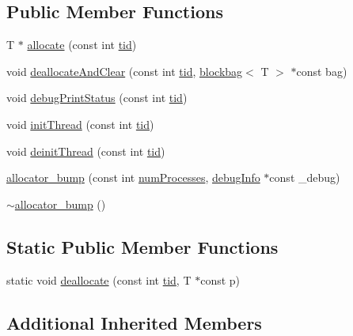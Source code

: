 \subsection*{Public Member Functions}
\begin{DoxyCompactItemize}
\item 
T $\ast$ \hyperlink{classallocator__bump_ac89d92a322a51aed0f08311ec3cdbed6}{allocate} (const int \hyperlink{microbench_2main_8cpp_a9ca9869868fe7e7a38a921cc7de4103f}{tid})
\item 
void \hyperlink{classallocator__bump_a8e6c842b2ebf9918ae2035eff838ff77}{deallocate\+And\+Clear} (const int \hyperlink{microbench_2main_8cpp_a9ca9869868fe7e7a38a921cc7de4103f}{tid}, \hyperlink{classblockbag}{blockbag}$<$ T $>$ $\ast$const bag)
\item 
void \hyperlink{classallocator__bump_a59eee0e27ff339347eff13214bafd377}{debug\+Print\+Status} (const int \hyperlink{microbench_2main_8cpp_a9ca9869868fe7e7a38a921cc7de4103f}{tid})
\item 
void \hyperlink{classallocator__bump_ac363b41fc27681855131e6d7c6c31407}{init\+Thread} (const int \hyperlink{microbench_2main_8cpp_a9ca9869868fe7e7a38a921cc7de4103f}{tid})
\item 
void \hyperlink{classallocator__bump_af360b0037db6b2f1ec78d4cf02ed04d9}{deinit\+Thread} (const int \hyperlink{microbench_2main_8cpp_a9ca9869868fe7e7a38a921cc7de4103f}{tid})
\item 
\hyperlink{classallocator__bump_a5ca967892617a91266d73adb94dd8e67}{allocator\+\_\+bump} (const int \hyperlink{testing_8cpp_aa085812188e21ede75351d88b9b2c30d}{num\+Processes}, \hyperlink{classdebugInfo}{debug\+Info} $\ast$const \+\_\+debug)
\item 
\hyperlink{classallocator__bump_ae5e0e9e8ffd3db2eda6dd4afe79e9425}{$\sim$allocator\+\_\+bump} ()
\end{DoxyCompactItemize}
\subsection*{Static Public Member Functions}
\begin{DoxyCompactItemize}
\item 
static void \hyperlink{classallocator__bump_aaa6343dd8055db71dc96fa66dc9e1702}{deallocate} (const int \hyperlink{microbench_2main_8cpp_a9ca9869868fe7e7a38a921cc7de4103f}{tid}, T $\ast$const p)
\end{DoxyCompactItemize}
\subsection*{Additional Inherited Members}



